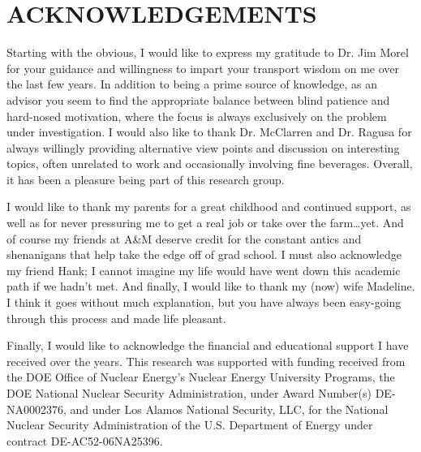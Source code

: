 %
%
%


\chapter*{ACKNOWLEDGEMENTS}

Starting with the obvious, I would like to express my gratitude to Dr. Jim Morel for your guidance and 
willingness to impart your transport wisdom on me over the last few years.  In addition to being a prime source of
knowledge, as an advisor you seem to find the appropriate balance between blind patience and hard-nosed
motivation, where the focus is always exclusively on the problem under investigation.
 I would also like to thank Dr. McClarren and Dr. Ragusa for always willingly providing
alternative view points and discussion on interesting topics, often unrelated to work and
occasionally involving fine beverages. Overall, it has been a pleasure being part of this research group. 

 I would like to thank my parents for a great childhood and continued support, as well
as for never pressuring me to get a real job or take over the farm\ldots yet.  And of course my friends
at A\&M deserve credit for the constant antics and shenanigans that help take the edge off of grad
school.  I must also acknowledge my friend Hank; I cannot imagine my life would have
went down this academic path if we hadn't met.  And finally, I would like to thank my (now) wife Madeline.  I think it goes without much
explanation, but you have always been easy-going through this process and made life pleasant.

Finally, I would like to acknowledge the financial and educational support I have received
over the years. This research was supported with funding received from the DOE Office of Nuclear
Energy's Nuclear Energy University Programs, the DOE National
Nuclear Security Administration, under Award Number(s) DE-NA0002376, and under Los Alamos National Security,
LLC, for the National Nuclear Security Administration of the U.S. Department of
Energy under contract DE-AC52-06NA25396. 
